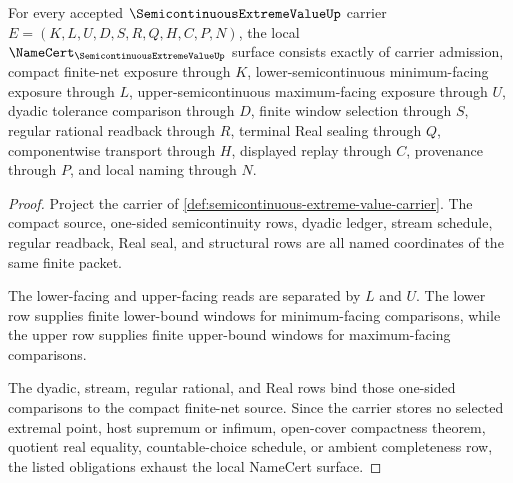 \begin{theorem}
\label{thm:semicontinuous-extreme-value-namecert-obligations}
For every accepted $\SemicontinuousExtremeValueUp$ carrier $E=(K,L,U,D,S,R,Q,H,C,P,N)$, the local $\NameCert_{\SemicontinuousExtremeValueUp}$ surface consists exactly of carrier admission, compact finite-net exposure through $K$, lower-semicontinuous minimum-facing exposure through $L$, upper-semicontinuous maximum-facing exposure through $U$, dyadic tolerance comparison through $D$, finite window selection through $S$, regular rational readback through $R$, terminal Real sealing through $Q$, componentwise transport through $H$, displayed replay through $C$, provenance through $P$, and local naming through $N$.
\end{theorem}
\begin{proof}
Project the carrier of \autoref{def:semicontinuous-extreme-value-carrier}. The compact source, one-sided semicontinuity rows, dyadic ledger, stream schedule, regular readback, Real seal, and structural rows are all named coordinates of the same finite packet.

The lower-facing and upper-facing reads are separated by $L$ and $U$. The lower row supplies finite lower-bound windows for minimum-facing comparisons, while the upper row supplies finite upper-bound windows for maximum-facing comparisons.

The dyadic, stream, regular rational, and Real rows bind those one-sided comparisons to the compact finite-net source. Since the carrier stores no selected extremal point, host supremum or infimum, open-cover compactness theorem, quotient real equality, countable-choice schedule, or ambient completeness row, the listed obligations exhaust the local NameCert surface.
\end{proof}

